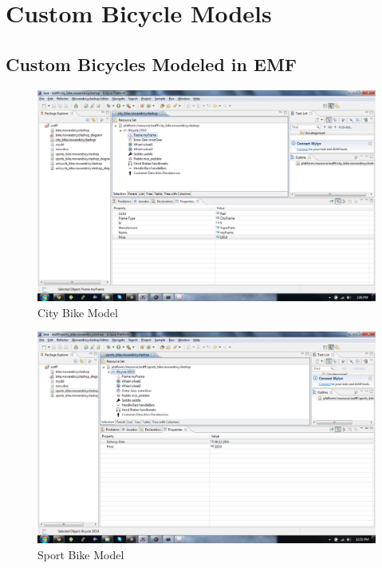 \section{Custom Bicycle Models}
\label{appendix.custom_bicycles}

\subsection{Custom Bicycles Modeled in EMF}
\label{appendix.emf_models}

\begin{figure}[H]
    \begin{center}
        \includegraphics[width=\textwidth]{fig/ecore_model_examples/new/ecore_city_model.pdf}
        \caption{City Bike Model}
        \label{fig.emf_city_bike}
    \end{center}
\end{figure}

\begin{figure}[H]
    \begin{center}
        \includegraphics[width=\textwidth]{fig/ecore_model_examples/new/ecore_sport_model.pdf}
        \caption{Sport Bike Model}
        \label{fig.emf_sport_model}
    \end{center}
\end{figure}

